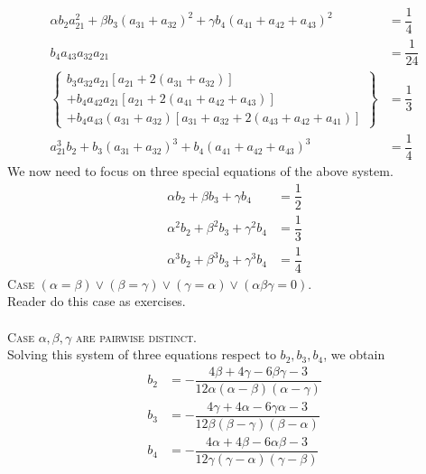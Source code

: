 \documentclass[a4paper,oneside]{book}
\numberwithin{equation}{chapter}
\begin{document}
\begin{align}
\alpha {b_2}a_{21}^2 + \beta {b_3}{\left( {{a_{31}} + {a_{32}}} \right)^2} + \gamma {b_4}{\left( {{a_{41}} + {a_{42}} + {a_{43}}} \right)^2} &= \dfrac{1}{4}\\
{b_4}{a_{43}}{a_{32}}{a_{21}} &= \dfrac{1}{{24}}\\
\left\{ {\begin{array}{*{20}{l}}
{{b_3}{a_{32}}{a_{21}}\left[ {{a_{21}} + 2\left( {{a_{31}} + {a_{32}}} \right)} \right]}\\
{ + {b_4}{a_{42}}{a_{21}}\left[ {{a_{21}} + 2\left( {{a_{41}} + {a_{42}} + {a_{43}}} \right)} \right]}\\
{ + {b_4}{a_{43}}\left( {{a_{31}} + {a_{32}}} \right)\left[ {{a_{31}} + {a_{32}} + 2\left( {{a_{43}} + {a_{42}} + {a_{41}}} \right)} \right]}
\end{array}} \right\} &= \dfrac{1}{3}\\
a_{21}^3{b_2} + {b_3}{\left( {{a_{31}} + {a_{32}}} \right)^3} + {b_4}{\left( {{a_{41}} + {a_{42}} + {a_{43}}} \right)^3} &= \dfrac{1}{4}
\end{align}
We now need to focus on three special equations of the above system.
\begin{align}
\alpha {b_2} + \beta {b_3} + \gamma {b_4} &= \dfrac{1}{2}\\
{\alpha ^2}{b_2} + {\beta ^2}{b_3} + {\gamma ^2}{b_4} &= \dfrac{1}{3}\\
{\alpha ^3}{b_2} + {\beta ^3}{b_3} + {\gamma ^3}{b_4} &= \dfrac{1}{4}
\end{align}
\textsc{Case $\left( {\alpha  = \beta } \right) \vee \left( {\beta  = \gamma } \right) \vee \left( {\gamma  = \alpha } \right) \vee \left( \alpha \beta \gamma =0 \right)$.}\\
Reader do this case as exercises.\\
\\
\textsc{Case $\alpha,\beta,\gamma$ are pairwise distinct.}\\
Solving this system of three equations respect to $b_2,b_3,b_4$, we obtain
\begin{align}
{b_2} &=  - \dfrac{{4\beta  + 4\gamma  - 6\beta \gamma  - 3}}{{12\alpha \left( {\alpha  - \beta } \right)\left( {\alpha  - \gamma } \right)}}\\
{b_3} &=  - \dfrac{{4\gamma  + 4\alpha  - 6\gamma \alpha  - 3}}{{12\beta \left( {\beta  - \gamma } \right)\left( {\beta  - \alpha } \right)}}\\
{b_4} &=  - \dfrac{{4\alpha  + 4\beta  - 6\alpha \beta  - 3}}{{12\gamma \left( {\gamma  - \alpha } \right)\left( {\gamma  - \beta } \right)}}
\end{align}
\end{document}
